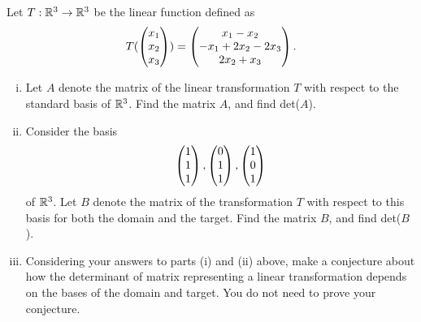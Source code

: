 \begin{question}
\normalfont
Let $T:{\mathbb R}^3\to{\mathbb R}^3$ be the linear function defined as
		\begin{align*}
			T(\begin{pmatrix} x_1\\ x_2\\ x_3\end{pmatrix}) = \begin{pmatrix} x_1-x_2\\ -x_1+2x_2-2x_3\\ 2x_2 + x_3\end{pmatrix}.
\end{align*}

\begin{enumerate}[(i)]

\item Let $A$ denote the matrix of the linear transformation $T$ with respect to the standard basis of ${\mathbb R}^3$. Find the matrix $A$, and find det($A$). \\

\item Consider the basis 
\[
\begin{pmatrix} 1\\ 1\\ 1\end{pmatrix}, \begin{pmatrix} 0\\ 1\\ 1\end{pmatrix},
 \begin{pmatrix} 1\\ 0\\ 1\end{pmatrix}
\]
of ${\mathbb R}^3$.  Let $B$ denote the matrix of the transformation $T$ with respect to this basis for both the domain and the target. Find the matrix $B$, and find det($B$). \\


\item Considering your answers to parts (i) and (ii) above, make a conjecture about how the determinant of matrix representing a linear transformation depends on the bases of the domain and target. You do not need to prove your conjecture. 
\end{enumerate}





\end{question}